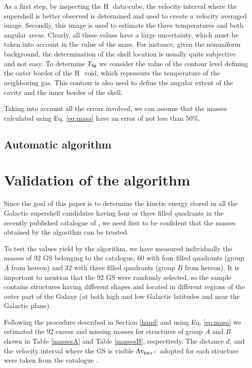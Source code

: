 \documentclass{aa}
\newcommand{\hi}{\mbox{H\,\sc{i}}}
\begin{document}
As a first step, by inspecting the \hi\, data-cube, the velocity interval where the supershell is better observed is determined and used to create a velocity  averaged image. Secondly, this image is used to estimate the three temperatures and both angular areas.
Clearly, all these values have a large uncertainty, which must be taken into account in the value of the mass.
For instance, given the nonuniform background, the determination of the shell location is usually quite subjective and not easy.
To determine $T_{\rm bg}$ we consider the value  of the contour level defining the outer border of the \hi\, void, which represents the temperature of the neighboring gas. This contour is also used to  define  the  angular  extent  of  the  cavity and the inner border of the shell.

Taking into account all the errors involved, we can assume that the masses  calculated using 
Eq. \ref{eq:masa} have an error of not less than 50\%.




\subsection{Automatic algorithm}
\label{algorithm}




\section{Validation of the algorithm}

Since the goal of this paper is to determine  the kinetic energy stored in  all the Galactic supershell candidates having  four or three filled quadrants in the recently published catalogue of \citet{sua14}, we need first to be confident that the  masses obtained by the algorithm can be trusted.

To test the values yield by the algorithm, we have measured individually the masses of 92 GS belonging to the catalogue, 60 with four filled quadrants (group $A$ from hereon) and 32 with three filled quadrants (group $B$ from hereon).
It is important to mention that the 92 GS were randomly selected, so the sample 
contains  structures having  different shapes  and located in different regions of the outer part of the Galaxy (at both high and low Galactic latitudes and near the Galactic plane).

Following the procedure described in Section \ref{hand} and using Eq. \ref{eq:masa} we estimated the 92 excess and missing masses for structures of group $A$ and $B$ shown in Table \ref{massesA} and Table \ref{massesB}, respectively. The distance $d$, and the velocity interval where the GS is visible 
$\Delta {\rm v}_{\rm km\,s^{-1}}$ adopted for each structure were taken from the catalogue \citep{sua14}.
\end{document}
